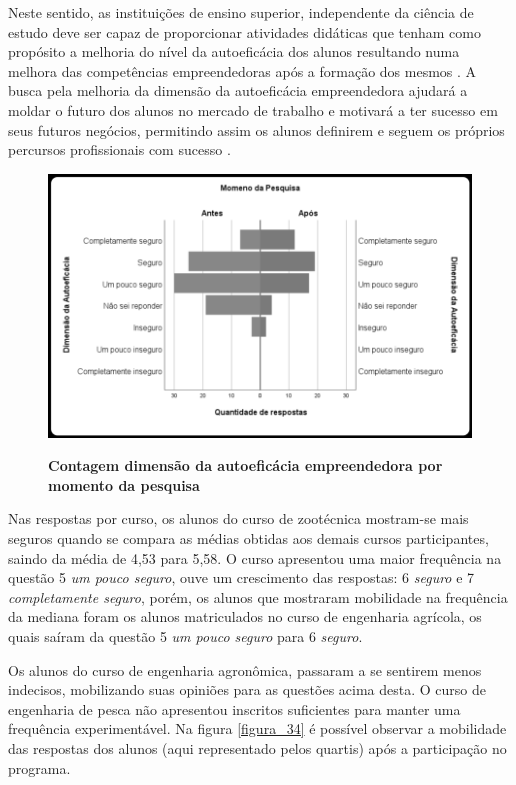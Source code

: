 Neste sentido, as instituições de ensino superior, independente da ciência de estudo deve ser capaz de proporcionar atividades didáticas que tenham como propósito a melhoria do nível da autoeficácia dos alunos resultando numa melhora das competências empreendedoras após a formação dos mesmos \cite{ribeiro_autoeficacia_2019}. A busca pela melhoria da dimensão da autoeficácia empreendedora ajudará a moldar o futuro dos alunos no mercado de trabalho e motivará a ter sucesso em seus futuros negócios, permitindo assim os alunos definirem e seguem os próprios percursos profissionais com sucesso \cite{das_examining_2018}.

\begin{figure}[H]
\centering
\caption{\textbf{
Contagem dimensão da autoeficácia empreendedora  por momento da pesquisa}}
\includegraphics[scale=0.4]{Imagens/histograma_autoeficacia_antes.png}
\label{figura_autoeficacia}
\end{figure}


Nas respostas por curso, os alunos do curso de zootécnica mostram-se mais seguros quando se compara as médias obtidas aos demais cursos participantes, saindo da média de 4,53 para 5,58. O curso apresentou uma maior frequência na questão 5 \textit{um pouco seguro}, ouve um crescimento das respostas: 6 \textit{seguro} e 7 \textit{completamente seguro}, porém, os alunos que mostraram mobilidade na frequência da mediana foram os alunos matriculados no curso de engenharia agrícola, os quais saíram da questão 5 \textit{um pouco seguro} para 6 \textit{seguro}.

Os alunos do curso de engenharia agronômica, passaram a se sentirem menos indecisos, mobilizando suas opiniões para as questões acima desta. O curso de engenharia de pesca não apresentou inscritos suficientes para manter uma frequência experimentável. Na figura \ref{figura_34} é possível observar a mobilidade das respostas dos alunos (aqui representado pelos quartis) após a participação no programa.

